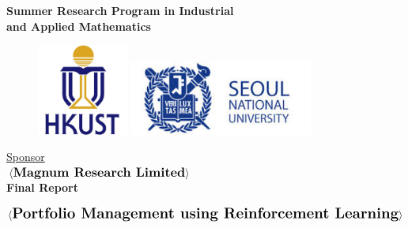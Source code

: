 \thispagestyle{empty}

\def\shiftdowna{0.32in}  %
\def\shiftdownb{0.22in}  %


\begin{center}
\textbf{{\large Summer Research Program in Industrial \\ and Applied Mathematics}}\\

\vspace \shiftdowna

\begin{figure}[h]
  \centering
  \begin{minipage}[b]{0.4\textwidth}
    \centering
    \includegraphics[width=3cm]{Graphics/HKUST_logo.jpg}
      \end{minipage}
  \begin{minipage}[b]{0.4\textwidth}
    \centering
    \includegraphics[width=6cm]{Graphics/SNU_logo.jpg}
      \end{minipage}
\end{figure}

\vspace \shiftdowna
\underline {Sponsor}\\ 
\vspace{5pt}
$\langle \textbf{{\large Magnum Research Limited}} \rangle$ \\
\vspace \shiftdowna
\textbf{Final Report}

\vspace \shiftdowna
$\langle \textbf{{\Large Portfolio Management using Reinforcement Learning}}\rangle$



\end{center}
